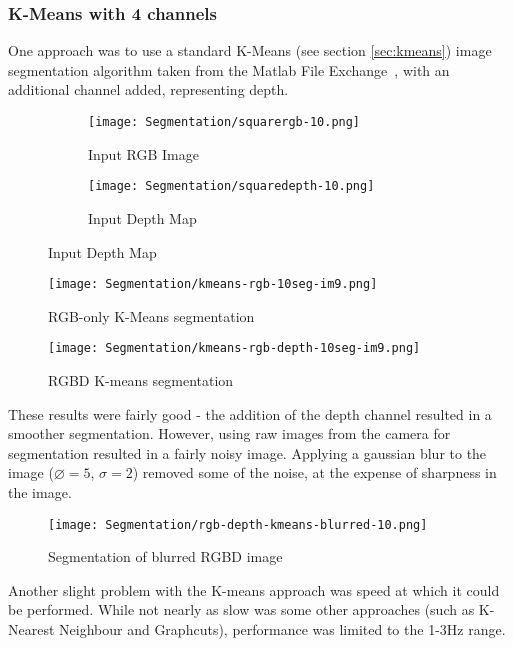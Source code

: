\subsubsection{K-Means with 4 channels}
One approach was to use a standard K-Means (see section \ref{sec:kmeans}) image segmentation algorithm taken from the Matlab File Exchange~\cite{kmeans-matlab}, with an additional channel added, representing depth. 

\begin{figure}[H]
    \centering
    \begin{subfigure}[b]{0.45\textwidth}
        \centering
        \texttt{[image: Segmentation/squarergb-10.png]}
        \caption{Input RGB Image}
    \end{subfigure}
    \hfill
    \begin{subfigure}[b]{0.45\textwidth}
        \centering
        \texttt{[image: Segmentation/squaredepth-10.png]}
        \caption{Input Depth Map}
    \end{subfigure}
\end{figure}

\begin{figure}[H]
    \centering
    \texttt{[image: Segmentation/kmeans-rgb-10seg-im9.png]}
    \caption{RGB-only K-Means segmentation}
\end{figure}

\begin{figure}[H]
    \centering
    \texttt{[image: Segmentation/kmeans-rgb-depth-10seg-im9.png]}
    \caption{RGBD K-means segmentation}
\end{figure}

These results were fairly good - the addition of the depth channel resulted in a smoother segmentation. However, using raw images from the camera for segmentation resulted in a fairly noisy image. Applying a gaussian blur to the image ($\diameter = 5$, $\sigma = 2$) removed some of the noise, at the expense of sharpness in the image.

\begin{figure}[H]
    \centering
    \texttt{[image: Segmentation/rgb-depth-kmeans-blurred-10.png]}
    \caption{Segmentation of blurred RGBD image}
\end{figure}

Another slight problem with the K-means approach was speed at which it could be performed. While not nearly as slow was some other approaches (such as K-Nearest Neighbour and Graphcuts), performance was limited to the 1-3Hz range.


